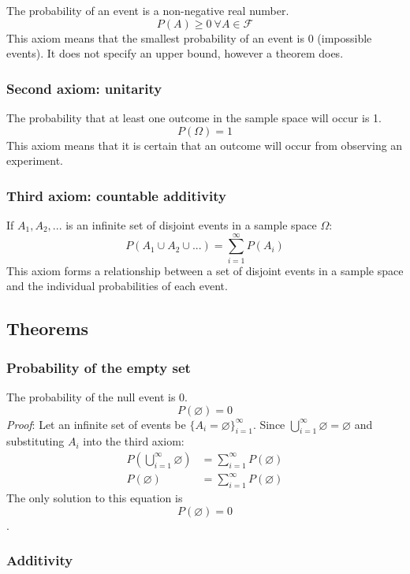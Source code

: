 \documentclass{article}
\begin{document}
The probability of an event is a non-negative real number.
\[P(A) \geq 0 \ \forall A \in \mathcal{F}\]
This axiom means that the smallest probability of an event is 0 (impossible events). It does not specify an upper bound, however a theorem does.

\subsubsection{Second axiom: unitarity}

The probability that at least one outcome in the sample space will occur is 1.
\[P(\Omega)=1\]
This axiom means that it is certain that an outcome will occur from observing an experiment.

\subsubsection{Third axiom: countable additivity}

If $A_1, A_2, ...$ is an infinite set of disjoint events in a sample space $\Omega$:
\[P(A_1 \cup A_2 \cup ...) = \sum_{i=1}^\infty P(A_i)\]
This axiom forms a relationship between a set of disjoint events in a sample space and the individual probabilities of each event.

\subsection{Theorems}

\subsubsection{Probability of the empty set}

The probability of the null event is 0.
\[P(\varnothing)=0\]
\textit{Proof}: Let an infinite set of events be $\{A_i=\varnothing \}_{i=1}^\infty$. Since $\bigcup_{i=1}^\infty \varnothing = \varnothing$ and substituting $A_i$ into the third axiom:
\begin{equation}
\begin{split}
P(\bigcup_{i=1}^\infty \varnothing) & = \sum_{i=1}^\infty P(\varnothing) \\
P(\varnothing) & = \sum_{i=1}^\infty P(\varnothing)
\end{split}
\end{equation}
The only solution to this equation is \[P(\varnothing)=0\].

\subsubsection{Additivity}
\end{document}
